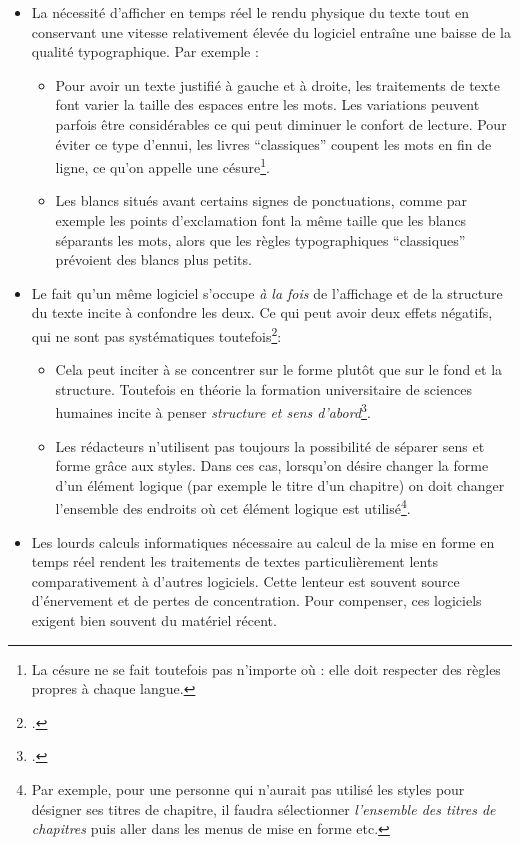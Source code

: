 \begin{itemize}
\item La nécessité d'afficher en temps réel le rendu physique du texte tout en conservant une vitesse relativement élevée du logiciel entraîne une baisse de la qualité typographique. Par exemple :
	\begin{itemize}
		\item Pour avoir un texte justifié à gauche et à droite, les traitements de texte font varier la taille des espaces entre les mots. Les variations peuvent parfois être considérables ce qui peut diminuer le confort de lecture. Pour éviter ce type d'ennui, les livres \enquote{classiques} coupent les mots en fin de ligne, ce qu'on appelle une césure\footnote{La césure ne se fait toutefois pas n'importe où : elle doit respecter des règles propres à chaque langue.}.
		\item Les blancs situés avant certains signes de ponctuations, comme par exemple les points d'exclamation font la même taille que les blancs séparants les mots, alors que les règles typographiques \enquote{classiques} prévoient des blancs plus petits.
	\end{itemize}
\item Le fait qu'un même logiciel s'occupe \emph{à la fois} de l'affichage et de la structure du texte incite à confondre les deux. Ce qui peut avoir deux effets négatifs, qui ne sont pas systématiques toutefois\footcite[Les auteurs de ces lignes sont moins sévères envers les traitements de texte que d'autres LaTeXiens : \cf][]{stupide}:
	\begin{itemize}
		\item Cela peut inciter à se concentrer sur le forme plutôt que sur le fond et la structure. Toutefois en théorie la formation universitaire de sciences humaines incite à penser \emph{structure et sens d'abord}\footcite[Voir un débat sur le blog d'un des auteurs]{structurevsforme}. 
		\item Les rédacteurs n'utilisent pas toujours la possibilité de séparer sens et forme grâce aux styles. Dans ces cas, lorsqu'on désire changer la forme d'un élément logique (par exemple le titre d'un chapitre) on doit changer l'ensemble des endroits où cet élément logique est utilisé\footnote{Par exemple, pour une personne  qui n'aurait pas utilisé les styles pour désigner ses titres de chapitre, il faudra sélectionner \emph{l'ensemble des titres de chapitres} puis aller dans les menus de mise en forme etc.}.
	\end{itemize}

\item Les lourds calculs informatiques nécessaire au calcul de la mise en forme en temps réel rendent les traitements de textes particulièrement lents comparativement à d'autres logiciels. Cette lenteur est souvent source d'énervement et de pertes de concentration. Pour compenser, ces logiciels exigent bien souvent du matériel récent.
\end{itemize}

